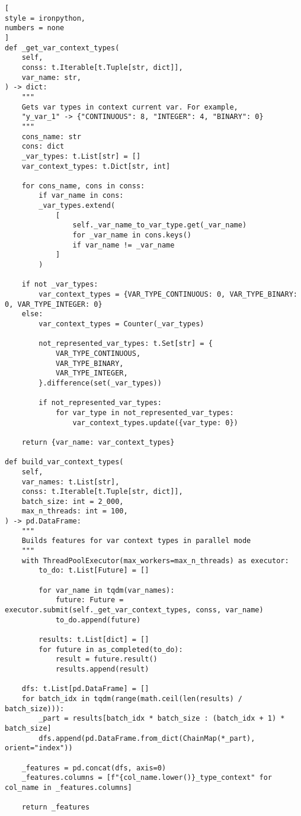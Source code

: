 \documentclass[%
	11pt,
	a4paper,
	utf8,
		]{article}
\begin{document}
\begin{lstlisting}[
style = ironpython,
numbers = none
]
def _get_var_context_types(
	self,
	conss: t.Iterable[t.Tuple[str, dict]],
	var_name: str,
) -> dict:
	"""
	Gets var types in context current var. For example,
	"y_var_1" -> {"CONTINUOUS": 8, "INTEGER": 4, "BINARY": 0}
	"""
	cons_name: str
	cons: dict
	_var_types: t.List[str] = []
	var_context_types: t.Dict[str, int]
	
	for cons_name, cons in conss:
		if var_name in cons:
		_var_types.extend(
			[
				self._var_name_to_var_type.get(_var_name)
				for _var_name in cons.keys()
				if var_name != _var_name
			]
		)
	
	if not _var_types:
		var_context_types = {VAR_TYPE_CONTINUOUS: 0, VAR_TYPE_BINARY: 0, VAR_TYPE_INTEGER: 0}
	else:
		var_context_types = Counter(_var_types)
	
		not_represented_var_types: t.Set[str] = {
			VAR_TYPE_CONTINUOUS,
			VAR_TYPE_BINARY,
			VAR_TYPE_INTEGER,
		}.difference(set(_var_types))
	
		if not_represented_var_types:
			for var_type in not_represented_var_types:
				var_context_types.update({var_type: 0})
	
	return {var_name: var_context_types}

def build_var_context_types(
	self,
	var_names: t.List[str],
	conss: t.Iterable[t.Tuple[str, dict]],
	batch_size: int = 2_000,
	max_n_threads: int = 100,
) -> pd.DataFrame:
	"""
	Builds features for var context types in parallel mode
	"""
	with ThreadPoolExecutor(max_workers=max_n_threads) as executor:
		to_do: t.List[Future] = []
	
		for var_name in tqdm(var_names):
			future: Future = executor.submit(self._get_var_context_types, conss, var_name)
			to_do.append(future)
	
		results: t.List[dict] = []
		for future in as_completed(to_do):
			result = future.result()
			results.append(result)
	
	dfs: t.List[pd.DataFrame] = []
	for batch_idx in tqdm(range(math.ceil(len(results) / batch_size))):
		_part = results[batch_idx * batch_size : (batch_idx + 1) * batch_size]
		dfs.append(pd.DataFrame.from_dict(ChainMap(*_part), orient="index"))
	
	_features = pd.concat(dfs, axis=0)
	_features.columns = [f"{col_name.lower()}_type_context" for col_name in _features.columns]
	
	return _features
\end{lstlisting}
\end{document}
